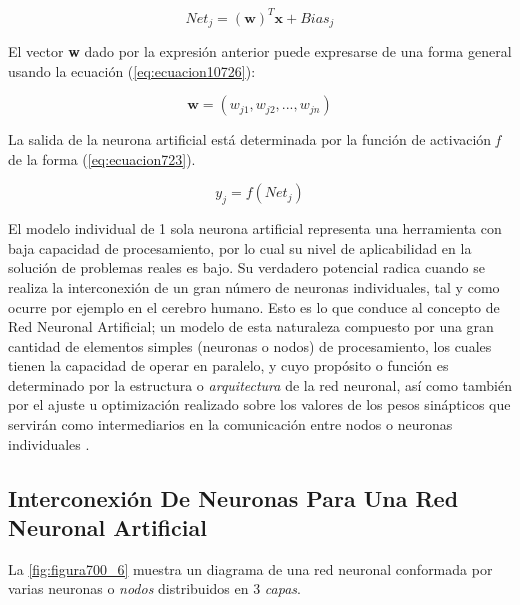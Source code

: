 {\begin{equation}
	Net_j=(\textbf{w})^{T} \textbf{x} + Bias_j
	\label{eq:ecuacion10722}
\end{equation}

El vector \textbf{w} dado por la expresión anterior puede expresarse de una forma general usando la ecuación (\ref{eq:ecuacion10726}):

\begin{equation}
	\textbf{w}=(w_{j1}, w_{j2}, ... , w_{jn})
	\label{eq:ecuacion10726}
\end{equation}

La salida de la neurona artificial está determinada por la función de activación \textit{f} de la forma (\ref{eq:ecuacion723}).

\begin{equation}
	y_j= f(Net_j)
	\label{eq:ecuacion723}
\end{equation}

El modelo individual de 1 sola neurona artificial representa una herramienta con baja capacidad de procesamiento, por lo cual su nivel de aplicabilidad en la solución de problemas reales es bajo. Su verdadero potencial radica 
cuando se realiza la interconexión de un gran número de neuronas individuales, tal y como ocurre por ejemplo en el cerebro humano. Esto es lo que conduce al concepto de Red Neuronal Artificial; un modelo de esta naturaleza 
compuesto por una gran cantidad de elementos simples (neuronas o nodos) de procesamiento, los cuales tienen la capacidad de operar en paralelo, y cuyo propósito o función es determinado por la estructura o \textit{arquitectura}
de la red neuronal, así como también por el ajuste u optimización realizado sobre los valores de los pesos sinápticos que servirán como intermediarios en la comunicación entre nodos o neuronas individuales \cite{caicedoANN}.

\subsection{Interconexión De Neuronas Para Una Red Neuronal Artificial}

La \autoref{fig:figura700_6} muestra un diagrama de una red neuronal conformada por varias neuronas o \textit{nodos} distribuidos en 3 \textit{capas}.

}
